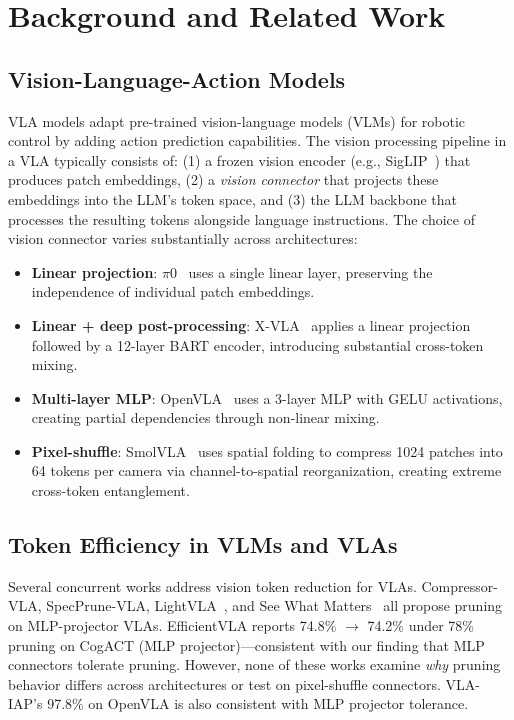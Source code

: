 \documentclass[letterpaper]{article}
\begin{document}
\section{Background and Related Work}

\subsection{Vision-Language-Action Models}

VLA models adapt pre-trained vision-language models (VLMs) for robotic control by adding action prediction capabilities. The vision processing pipeline in a VLA typically consists of: (1) a frozen vision encoder (e.g., SigLIP~\cite{zhai2023sigmoid}) that produces patch embeddings, (2) a \emph{vision connector} that projects these embeddings into the LLM's token space, and (3) the LLM backbone that processes the resulting tokens alongside language instructions. The choice of vision connector varies substantially across architectures:

\begin{itemize}[leftmargin=*,nosep]
    \item \textbf{Linear projection}: $\pi$0~\cite{black2024pi0} uses a single linear layer, preserving the independence of individual patch embeddings.
    \item \textbf{Linear + deep post-processing}: X-VLA~\cite{zhen2024xvla} applies a linear projection followed by a 12-layer BART encoder, introducing substantial cross-token mixing.
    \item \textbf{Multi-layer MLP}: OpenVLA~\cite{kim2024openvla} uses a 3-layer MLP with GELU activations, creating partial dependencies through non-linear mixing.
    \item \textbf{Pixel-shuffle}: SmolVLA~\cite{smolvla2025} uses spatial folding to compress 1024 patches into 64 tokens per camera via channel-to-spatial reorganization, creating extreme cross-token entanglement.
\end{itemize}

\subsection{Token Efficiency in VLMs and VLAs}

Several concurrent works address vision token reduction for VLAs. Compressor-VLA, SpecPrune-VLA, LightVLA~\cite{lightvla2025}, and See What Matters~\cite{seewhatmatters2025} all propose pruning on MLP-projector VLAs. EfficientVLA reports 74.8\% $\to$ 74.2\% under 78\% pruning on CogACT (MLP projector)---consistent with our finding that MLP connectors tolerate pruning. However, none of these works examine \emph{why} pruning behavior differs across architectures or test on pixel-shuffle connectors. VLA-IAP's 97.8\% on OpenVLA is also consistent with MLP projector tolerance.
\end{document}
